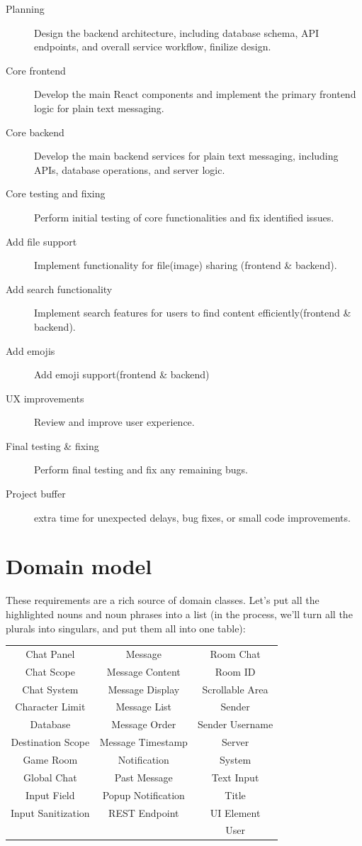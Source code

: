 \documentclass[]{VUMIFTemplateClass}
\begin{document}
\begin{description}
    \item[Planning] Design the backend architecture, including database schema, API endpoints, and overall service workflow, finilize design.
    \item[Core frontend] Develop the main React components and implement the primary frontend logic for plain text messaging.
    \item[Core backend] Develop the main backend services for plain text messaging, including APIs, database operations, and server logic.
    \item[Core testing and fixing] Perform initial testing of core functionalities and fix identified issues.
    \item[Add file support] Implement functionality for file(image) sharing (frontend \& backend).
    \item[Add search functionality] Implement search features for users to find content efficiently(frontend \& backend).
    \item[Add emojis] Add emoji support(frontend \& backend)
    \item[UX improvements] Review and improve user experience.
    \item[Final testing \& fixing] Perform final testing and fix any remaining bugs.
    \item[Project buffer] extra time for unexpected delays, bug fixes, or small code improvements.
\end{description}


\section{Domain model}
These requirements are a rich source of domain classes. Let’s put all the highlighted
nouns and noun phrases into a list (in the process, we’ll turn all the plurals into singulars,
and put them all into one table):

\begin{table}[H]
    \centering
    \begin{tabular}{ccc}
        Chat Panel & Message & Room Chat \\ 
        Chat Scope & Message Content & Room ID \\ 
        Chat System & Message Display & Scrollable Area \\ 
        Character Limit & Message List & Sender \\ 
        Database & Message Order & Sender Username \\ 
        Destination Scope & Message Timestamp & Server \\ 
        Game Room & Notification & System \\ 
        Global Chat & Past Message & Text Input \\ 
        Input Field & Popup Notification & Title \\ 
        Input Sanitization & REST Endpoint & UI Element \\ 
        &  & User \\ 
    \end{tabular}
\end{table}
\end{document}

